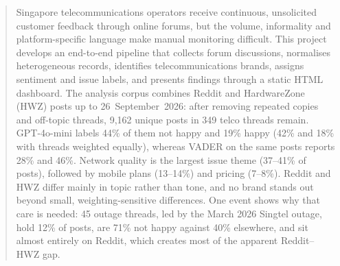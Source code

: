\documentclass[11pt,a4paper]{article}
\begin{document}
\begin{abstract}
Singapore telecommunications operators receive continuous, unsolicited customer feedback through online forums, but the volume, informality and platform-specific language make manual monitoring difficult. This project develops an end-to-end pipeline that collects forum discussions, normalises heterogeneous records, identifies telecommunications brands, assigns sentiment and issue labels, and presents findings through a static HTML dashboard. The analysis corpus combines Reddit and HardwareZone (HWZ) posts up to 26~September~2026: after removing repeated copies and off-topic threads, 9,162 unique posts in 349 telco threads remain. GPT-4o-mini labels 44\% of them not happy and 19\% happy (42\% and 18\% with threads weighted equally), whereas VADER on the same posts reports 28\% and 46\%. Network quality is the largest issue theme (37--41\% of posts), followed by mobile plans (13--14\%) and pricing (7--8\%). Reddit and HWZ differ mainly in topic rather than tone, and no brand stands out beyond small, weighting-sensitive differences. One event shows why that care is needed: 45 outage threads, led by the March 2026 Singtel outage, hold 12\% of posts, are 71\% not happy against 40\% elsewhere, and sit almost entirely on Reddit, which creates most of the apparent Reddit--HWZ gap.


\end{abstract}
\end{document}
